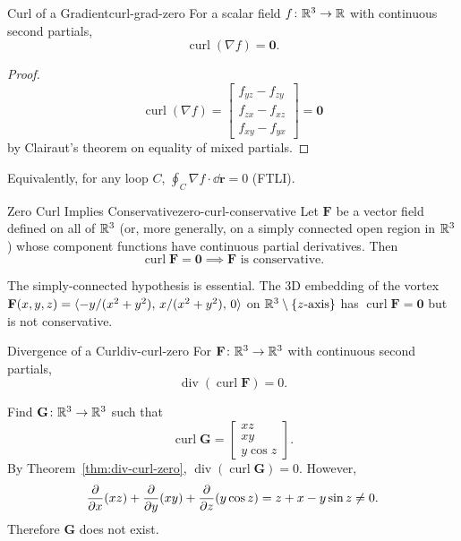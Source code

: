 \begin{theorem}{Curl of a Gradient}{curl-grad-zero}
  For a scalar field $f\colon\mathbb{R}^3\to\mathbb{R}$ with continuous second partials,
  \[
    \operatorname{curl}(\nabla f) = \mathbf{0}.
  \]
\end{theorem}

\begin{proof}
  \[
    \operatorname{curl}(\nabla f)
    =
    \begin{bmatrix}
      f_{yz} - f_{zy} \\
      f_{zx} - f_{xz} \\
      f_{xy} - f_{yx}
    \end{bmatrix}
    = \mathbf{0}
  \]
  by Clairaut's theorem on equality of mixed partials.
\end{proof}

\begin{remark}
  Equivalently, for any loop $C$, $\oint_C \nabla f\cdot\dd{\mathbf{r}}=0$ (FTLI).
\end{remark}

\begin{theorem}{Zero Curl Implies Conservative}{zero-curl-conservative}
  Let $\mathbf{F}$ be a vector field defined on all of $\mathbb{R}^3$ (or, more generally, on a simply connected open region in $\mathbb{R}^3$) whose component functions have continuous partial derivatives. Then
  \[
    \operatorname{curl}\mathbf{F}=\mathbf{0} \implies \mathbf{F} \text{ is conservative.}
  \]
\end{theorem}

\begin{remark}
  The simply-connected hypothesis is essential. The 3D embedding of the vortex
  $\mathbf{F}(x,y,z)=\langle -y/(x^2+y^2),\,x/(x^2+y^2),\,0 \rangle$ on $\mathbb{R}^3\setminus\{z\text{-axis}\}$
  has $\operatorname{curl}\mathbf{F}=\mathbf{0}$ but is not conservative.
\end{remark}

\begin{theorem}{Divergence of a Curl}{div-curl-zero}
  For $\mathbf{F}\colon\mathbb{R}^3\to\mathbb{R}^3$ with continuous second partials,
  \[
    \operatorname{div}(\operatorname{curl}\mathbf{F}) = 0.
  \]
\end{theorem}

\begin{example}
  Find $\mathbf{G}\colon\mathbb{R}^3\to\mathbb{R}^3$ such that
  \[
    \operatorname{curl}\mathbf{G}
    =
    \begin{bmatrix}
      xz \\xy\\y\cos z
    \end{bmatrix}
    .
  \]
  By Theorem~\ref{thm:div-curl-zero}, $\operatorname{div}(\operatorname{curl}\mathbf{G})=0$. However,
  \[
    \frac{\partial }{\partial x}(xz) + \frac{\partial }{\partial y}(xy) + \frac{\partial }{\partial z}(y\cos z)
    = z + x - y\sin z
    \neq 0.
  \]
  Therefore $\mathbf{G}$ does not exist.
\end{example}

